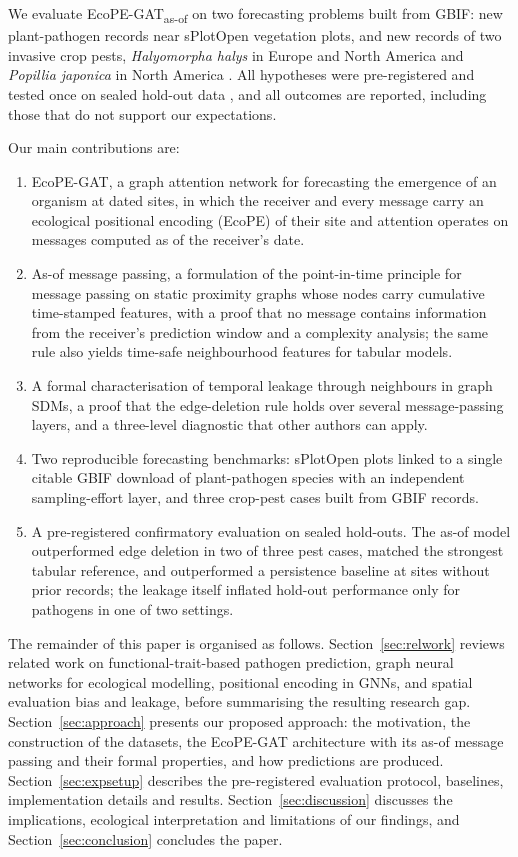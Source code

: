 \documentclass[a4paper,fleqn]{cas-sc}
\newcommand{\Masof}{\mbox{EcoPE-GAT\textsubscript{as-of}}}
\begin{document}
We evaluate \Masof{} on two forecasting problems built from GBIF: new plant-pathogen records near \nEligible{} sPlotOpen vegetation plots, and new records of two invasive crop pests, \textit{Halyomorpha halys} in Europe and North America and \textit{Popillia japonica} in North America \citep{leskey2018,althoff2022}. All hypotheses were pre-registered and tested once on sealed hold-out data \citep{nosek2018}, and all outcomes are reported, including those that do not support our expectations.

Our main contributions are:
\begin{enumerate}[leftmargin=1.4em]
  \item EcoPE-GAT, a graph attention network for forecasting the emergence of an organism at dated sites, in which the receiver and every message carry an ecological positional encoding (EcoPE) of their site and attention operates on messages computed as of the receiver's date.
  \item As-of message passing, a formulation of the point-in-time principle for message passing on static proximity graphs whose nodes carry cumulative time-stamped features, with a proof that no message contains information from the receiver's prediction window and a complexity analysis; the same rule also yields time-safe neighbourhood features for tabular models.
  \item A formal characterisation of temporal leakage through neighbours in graph SDMs, a proof that the edge-deletion rule holds over several message-passing layers, and a three-level diagnostic that other authors can apply.
  \item Two reproducible forecasting benchmarks: sPlotOpen plots linked to a single citable GBIF download of \gbifSpecies{} plant-pathogen species with an independent sampling-effort layer, and three crop-pest cases built from GBIF records.
  \item A pre-registered confirmatory evaluation on sealed hold-outs. The as-of model outperformed edge deletion in two of three pest cases, matched the strongest tabular reference, and outperformed a persistence baseline at sites without prior records; the leakage itself inflated hold-out performance only for pathogens in one of two settings.
\end{enumerate}

The remainder of this paper is organised as follows. Section~\ref{sec:relwork} reviews related work on functional-trait-based pathogen prediction, graph neural networks for ecological modelling, positional encoding in GNNs, and spatial evaluation bias and leakage, before summarising the resulting research gap. Section~\ref{sec:approach} presents our proposed approach: the motivation, the construction of the datasets, the EcoPE-GAT architecture with its as-of message passing and their formal properties, and how predictions are produced. Section~\ref{sec:expsetup} describes the pre-registered evaluation protocol, baselines, implementation details and results. Section~\ref{sec:discussion} discusses the implications, ecological interpretation and limitations of our findings, and Section~\ref{sec:conclusion} concludes the paper.
\end{document}
